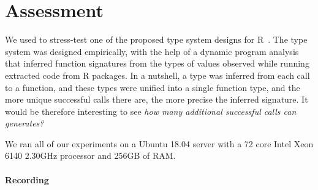 \documentclass[sigplan,anonymous,review]{acmart}
\begin{document}
%
%

\section{Assessment}
\label{sec:assessment}

We used \tool to stress-test one of the proposed type system designs for R~\cite{turcotte2020designing}.
The type system was designed empirically, with the help of a dynamic program analysis that inferred function signatures from the types of values observed while running extracted code from R packages.
In a nutshell, a type was inferred from each call to a function, and these types were unified into a single function type, and the more unique successful calls there are, the more precise the inferred signature.
It would be therefore interesting to see \emph{how many additional successful calls can \tool generates?}

We ran all of our experiments on a Ubuntu 18.04 server with a 72 core Intel Xeon 6140 2.30GHz processor and 256GB of RAM. 

\paragraph{Recording}
\end{document}
